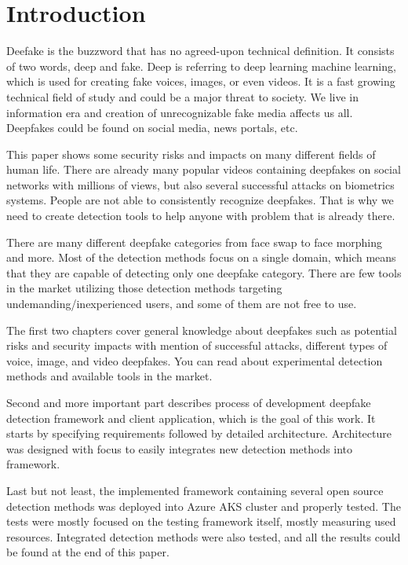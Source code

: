 \chapter{Introduction}

Deefake is the buzzword that has no agreed-upon technical definition. It consists of two words, deep and fake. Deep is referring to deep learning machine learning, which is used for creating fake voices, images, or even videos. It is a fast growing technical field of study and could be a major threat to society. We live in information era and creation of unrecognizable fake media affects us all. Deepfakes could be found on social media, news portals, etc.

This paper shows some security risks and impacts on many different fields of human life. There are already many popular videos containing deepfakes on social networks with millions of views, but also several successful attacks on biometrics systems. People are not able to consistently recognize deepfakes. That is why we need to create detection tools to help anyone with problem that is already there.

There are many different deepfake categories from face swap to face morphing and more. Most of the detection methods focus on a single domain, which means that they are capable of detecting only one deepfake category. There are few tools in the market utilizing those detection methods targeting undemanding/inexperienced users, and some of them are not free to use.

The first two chapters cover general knowledge about deepfakes such as potential risks and security impacts with mention of successful attacks, different types of voice, image, and video deepfakes. You can read about experimental detection methods and available tools in the market.

Second and more important part describes process of development deepfake detection framework and client application, which is the goal of this work. It starts by specifying requirements followed by detailed architecture. Architecture was designed with focus to easily integrates new detection methods into framework.

Last but not least, the implemented framework containing several open source detection methods was deployed into Azure AKS cluster and properly tested. The tests were mostly focused on the testing framework itself, mostly measuring used resources. Integrated detection methods were also tested, and all the results could be found at the end of this paper.

